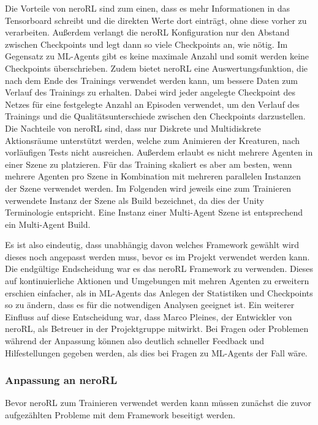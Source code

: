Die Vorteile von neroRL sind zum einen, dass es mehr Informationen in das Tensorboard schreibt und die direkten Werte dort einträgt, ohne diese vorher zu verarbeiten. Außerdem verlangt die neroRL Konfiguration nur den Abstand zwischen Checkpoints und legt dann so viele Checkpoints an, wie nötig. Im Gegensatz zu ML-Agents gibt es keine maximale Anzahl und somit werden keine Checkpoints überschrieben. 
Zudem bietet neroRL eine Auswertungsfunktion, die nach dem Ende des Trainings verwendet werden kann, um bessere Daten zum Verlauf des Trainings zu erhalten.
Dabei wird jeder angelegte Checkpoint des Netzes für eine festgelegte Anzahl an Episoden verwendet, um den Verlauf des Trainings und die Qualitätsunterschiede zwischen den Checkpoints darzustellen.
Die Nachteile von neroRL sind, dass nur Diskrete und Multidiskrete Aktionsräume unterstützt werden, welche zum Animieren der Kreaturen, nach vorläufigen Tests nicht ausreichen. Außerdem erlaubt es nicht mehrere Agenten in einer Szene zu platzieren. Für das Training skaliert es aber am besten, wenn mehrere Agenten pro Szene in Kombination mit mehreren parallelen Instanzen der Szene verwendet werden. Im Folgenden wird jeweils eine zum Trainieren verwendete Instanz der Szene als Build bezeichnet, da dies der Unity Terminologie entspricht. Eine Instanz einer Multi-Agent Szene ist entsprechend ein Multi-Agent Build.

Es ist also eindeutig, dass unabhängig davon welches Framework gewählt wird dieses noch angepasst werden muss, bevor es im Projekt verwendet werden kann. Die endgültige Endscheidung war es das neroRL Framework zu verwenden. Dieses auf kontinuierliche Aktionen und Umgebungen mit mehren Agenten zu erweitern erschien einfacher, als in ML-Agents das Anlegen der Statistiken und Checkpoints so zu ändern, dass es für die notwendigen Analysen geeignet ist. 
Ein weiterer Einfluss auf diese Entscheidung war, dass Marco Pleines, der Entwickler von neroRL, als Betreuer in der Projektgruppe mitwirkt. Bei Fragen oder Problemen während der Anpassung können also deutlich schneller Feedback und Hilfestellungen gegeben werden, als dies bei Fragen zu ML-Agents der Fall wäre.

\subsubsection{Anpassung an neroRL} \label{neroAnpassungKonzept}

Bevor neroRL zum Trainieren verwendet werden kann müssen zunächst die zuvor aufgezählten Probleme mit dem Framework beseitigt werden.\\

